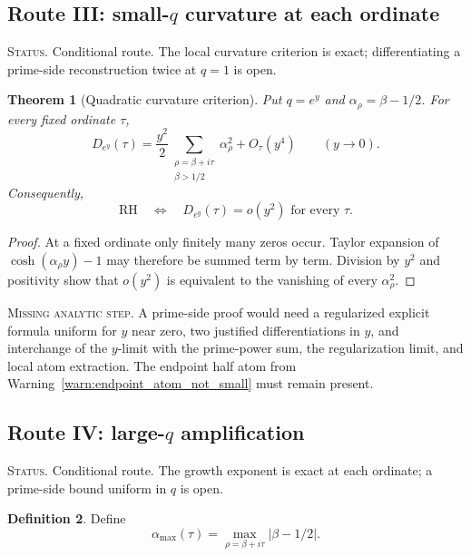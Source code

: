 \documentclass[11pt]{amsart}
\numberwithin{equation}{section}
\theoremstyle{plain}
\newtheorem{theorem}{Theorem}[section]
\theoremstyle{definition}
\newtheorem{definition}[theorem]{Definition}
\theoremstyle{remark}
\newcommand{\RH}{\mathrm{RH}}
\newcommand{\1}{\mathbf{1}}
\newcommand{\statusnote}[1]{%
  \par\smallskip\noindent
  \begingroup\footnotesize\textsc{Status.} #1\endgroup
  \par\smallskip}
\newcommand{\missingnote}[1]{%
  \par\smallskip\noindent
  \begingroup\footnotesize\textsc{Missing analytic step.} #1\endgroup
  \par\smallskip}
\begin{document}
\subsection{Route III: small-\texorpdfstring{\(q\)}{q} curvature at each ordinate}
\label{subsec:route_small_q}

\statusnote{Conditional route.  The local curvature criterion is exact; differentiating a prime-side reconstruction twice at $q=1$ is open.}
\begin{theorem}[Quadratic curvature criterion]
\label{thm:small_q_curvature}
Put $q=e^y$ and $\alpha_\rho=\beta-1/2$.  For every fixed ordinate $\tau$,
\begin{equation}
D_{e^y}(\tau)
=
\frac{y^2}{2}
\sum_{\substack{\rho=\beta+i\tau\\\beta>1/2}}
\alpha_\rho^2
+O_\tau(y^4)
\qquad(y\to0).
\label{eq:small_q_curvature_expansion}
\end{equation}
Consequently,
\begin{equation}
\RH
\quad\Longleftrightarrow\quad
D_{e^y}(\tau)=o(y^2)
\text{ for every }\tau.
\label{eq:small_q_curvature_criterion}
\end{equation}
\end{theorem}

\begin{proof}
At a fixed ordinate only finitely many zeros occur.  Taylor expansion of
$\cosh(\alpha_\rho y)-1$ may therefore be summed term by term.  Division by
$y^2$ and positivity show that $o(y^2)$ is equivalent to the vanishing of
every $\alpha_\rho^2$.
\end{proof}

\missingnote{A prime-side proof would need a regularized explicit formula
uniform for $y$ near zero, two justified differentiations in $y$, and
interchange of the $y$-limit with the prime-power sum, the regularization
limit, and local atom extraction.  The endpoint half atom from
Warning~\ref{warn:endpoint_atom_not_small} must remain present.}

\subsection{Route IV: large-\texorpdfstring{\(q\)}{q} amplification}
\label{subsec:route_large_q}

\statusnote{Conditional route.  The growth exponent is exact at each ordinate; a prime-side bound uniform in $q$ is open.}
\begin{definition}
\label{def:max_horizontal_displacement}
Define
\begin{equation}
\alpha_{\max}(\tau)
=
\max_{\rho=\beta+i\tau}|\beta-1/2|.
\label{eq:max_horizontal_displacement}
\end{equation}
\end{definition}
\end{document}
